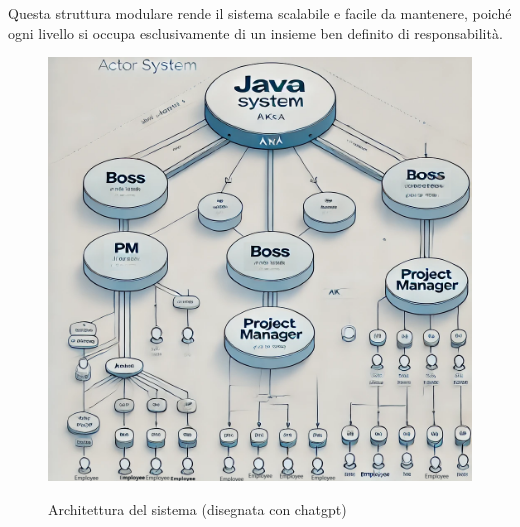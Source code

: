 Questa struttura modulare rende il sistema scalabile e facile da mantenere, poiché ogni livello si occupa esclusivamente di un insieme ben definito di responsabilità.


\begin{figure}[h]

\includegraphics[width=15cm]{report/img/chaGpt-graph.png}\\[0.5cm]
\caption{Architettura del sistema (disegnata con chatgpt)}
\end{figure}

